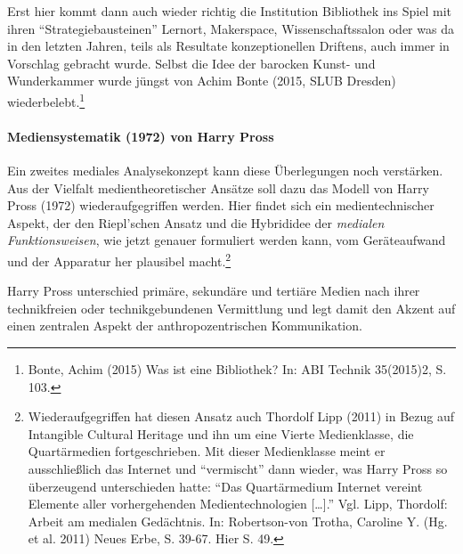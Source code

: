 \documentclass[a4paper,
fontsize=11pt,
oneside,
numbers=noperiodatend,
parskip=half-,
bibliography=totoc,
final
]{scrartcl}
\begin{document}
Erst hier kommt dann auch wieder richtig die Institution Bibliothek ins
Spiel mit ihren \enquote{Strategiebausteinen} Lernort, Makerspace,
Wissenschaftssalon oder was da in den letzten Jahren, teils als
Resultate konzeptionellen Driftens, auch immer in Vorschlag gebracht
wurde. Selbst die Idee der barocken Kunst- und Wunderkammer wurde jüngst
von Achim Bonte (2015, SLUB Dresden) wiederbelebt.\footnote{Bonte, Achim
  (2015) Was ist eine Bibliothek? In: ABI Technik 35(2015)2, S. 103.}

\paragraph{Mediensystematik (1972) von Harry
Pross}\label{mediensystematik-1972-von-harry-pross}

Ein zweites mediales Analysekonzept kann diese Überlegungen noch
verstärken. Aus der Vielfalt medientheoretischer Ansätze soll dazu das
Modell von Harry Pross (1972) wiederaufgegriffen werden. Hier findet
sich ein medientechnischer Aspekt, der den Riepl'schen Ansatz und die
Hybrididee der \emph{medialen Funktionsweisen}, wie jetzt genauer
formuliert werden kann, vom Geräteaufwand und der Apparatur her
plausibel macht.\footnote{Wiederaufgegriffen hat diesen Ansatz auch
  Thordolf Lipp (2011) in Bezug auf Intangible Cultural Heritage und ihn
  um eine Vierte Medienklasse, die Quartärmedien fortgeschrieben. Mit
  dieser Medienklasse meint er ausschließlich das Internet und
  \enquote{vermischt} dann wieder, was Harry Pross so überzeugend
  unterschieden hatte: \enquote{Das Quartärmedium Internet vereint
  Elemente aller vorhergehenden Medientechnologien {[}\ldots{}{]}.} Vgl.
  Lipp, Thordolf: Arbeit am medialen Gedächtnis. In: Robertson-von
  Trotha, Caroline Y. (Hg. et al. 2011) Neues Erbe, S. 39-67. Hier S.
  49.}

Harry Pross unterschied primäre, sekundäre und tertiäre Medien nach
ihrer technikfreien oder technikgebundenen Vermittlung und legt damit
den Akzent auf einen zentralen Aspekt der anthropozentrischen
Kommunikation.
\end{document}
